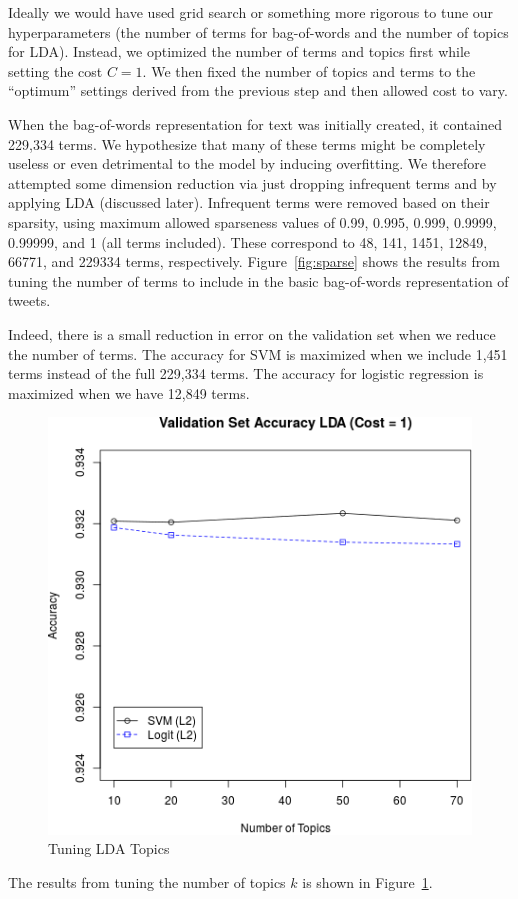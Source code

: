 \documentclass{sig-alternate-05-2015}
\begin{document}
Ideally we would have used grid search or something more rigorous to tune our hyperparameters (the number of terms for bag-of-words and the number of topics for LDA). Instead, we optimized the number of terms and topics first while setting the cost $C=1$. We then fixed the number of topics and terms to the ``optimum'' settings derived from the previous step and then allowed cost to vary.

When the bag-of-words representation for text was initially created, it contained 229,334 terms. We hypothesize that many of these terms might be completely useless or even detrimental to the model by inducing overfitting. We therefore attempted some dimension reduction via just dropping infrequent terms and by applying LDA (discussed later). Infrequent terms were removed based on their sparsity, using maximum allowed sparseness values of 0.99, 0.995, 0.999, 0.9999, 0.99999, and 1 (all terms included). These correspond to 48, 141, 1451, 12849, 66771, and 229334 terms, respectively. Figure~\ref{fig:sparse} shows the results from tuning the number of terms to include in the basic bag-of-words representation of tweets. 

Indeed, there is a small reduction in error on the validation set when we reduce the number of terms. The accuracy for SVM is maximized when we include 1,451 terms instead of the full 229,334 terms. The accuracy for logistic regression is maximized when we have 12,849 terms.

\begin{figure}
  \centering
  \includegraphics[scale=0.5]{valid_k.png}
  \caption{Tuning LDA Topics}
  \label{fig:LDA}
\end{figure}
The results from tuning the number of topics $k$ is shown in Figure~\ref{fig:LDA}.
\end{document}
